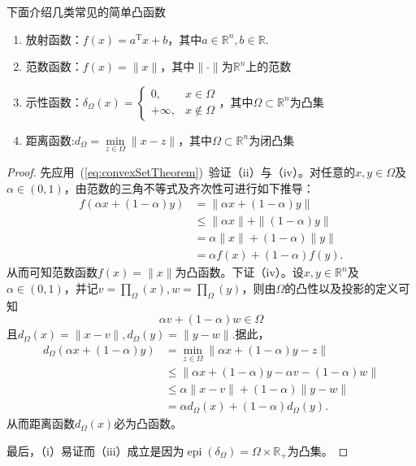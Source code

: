 \begin{example}
    下面介绍几类常见的简单凸函数
    \begin{enumerate}[label=(\roman*)]
        \item 放射函数：$f(x)=a^{\mathrm{T}}x+b$，其中$a\in\mathbb{R}^n,b\in\mathbb{R}$.
        \item 范数函数：$f(x) = \|x\|$，其中$\|\cdot\|$为$\mathbb{R}^n$上的范数
        \item 示性函数：$\left.\delta_\Omega(x)=\left\{\begin{array}{cc}0,&x\in\Omega\\+\infty,&x\notin\Omega\end{array}\right.\right.$，其中$\Omega\subset \mathbb{R}^n$为凸集
        \item 距离函数:$d_{\Omega} = \min\limits_{z\in\Omega}\|x-z\|$，其中$\Omega\subset \mathbb{R}^n$为闭凸集
    \end{enumerate}
\end{example}
\begin{proof}
    先应用~(\ref{eq:convexSetTheorem})~验证（ii）与（iv）。对任意的$x,y\in\Omega$及$\alpha\in(0,1)$，由范数的三角不等式及齐次性可进行如下推导：
    \[
        \begin{aligned}
            f(\alpha x+(1-\alpha)y)& =\|\alpha x+(1-\alpha)y\|  \\
            &\leq\|\alpha x\|+\|(1-\alpha)y\| \\
            &=\alpha\|x\|+(1-\alpha)\|y\| \\
            &=\alpha f(x)+(1-\alpha)f(y).
        \end{aligned}
    \]
    从而可知范数函数$f(x) = \|x\|$为凸函数。下证（iv）。设$x,y\in\mathbb{R}^n$及$\alpha\in(0,1)$，并记$v = \prod_{\Omega}(x),w = \prod_{\Omega}(y)$，则由$\Omega$的凸性以及投影的定义可知
    \[
        \alpha v + (1-\alpha)w\in \Omega
    \]
    且$d_{\Omega}(x)=\|x-v\|,d_{\Omega}(y)=\|y-w\|.$据此，
    \[
        \begin{aligned}
            d_\Omega(\alpha x+(1-\alpha)y)& =\min_{z\in\Omega}\|\alpha x+(1-\alpha)y-z\|  \\
            &\leq\|\alpha x+(1-\alpha)y-\alpha v-(1-\alpha)w\| \\
            &\leq\alpha\|x-v\|+(1-\alpha)\|y-w\| \\
            &=\alpha d_\Omega(x)+(1-\alpha)d_\Omega(y).
        \end{aligned}
    \]
    从而距离函数$d_{\Omega}(x)$必为凸函数。

    最后，（i）易证而（iii）成立是因为$\operatorname{epi}(\delta_{\Omega}) = \Omega\times \mathbb{R}_{+}$为凸集。
\end{proof}

